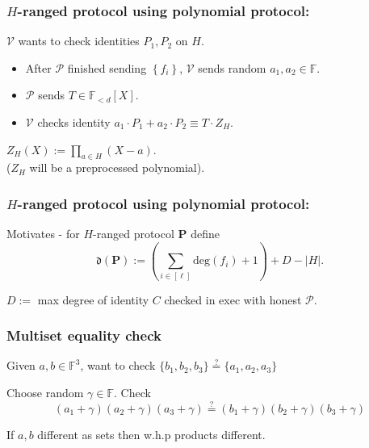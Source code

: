 \documentclass[shadesubsections,compress,14pt,mathserif]{beamer}
\newcommand{\prot}{\mathbf{P}}
\newcommand{\aggdeg}[1]{\mathfrak{d}(#1)}
\renewcommand{\deg}{\mathrm{deg}}
\newcommand{\F}{\ensuremath{\mathbb F}}
\newcommand{\set}[1]{\ensuremath{\left\{#1\right\}}}
\newcommand{\defeq}{\ensuremath{:=}}
\newcommand{\ver}{\ensuremath{\mathcal{V}}}
\newcommand{\prv}{\ensuremath{\mathcal{P}}}
\newcommand{\polysofdeg}[1]{\F_{< #1}[X]}
\begin{document}
\begin{frame}
\frametitle{$H$-ranged protocol using polynomial protocol:}   %
 
 
 $\ver$ wants to check identities $P_1,P_2$ on $H$.\\
 \vspace{0.2in}
\begin{itemize}
\item  After $\prv$ finished sending \set{f_i}, $\ver$ sends random $a_1,a_2\in \F$.\\ \pause
\item $\prv$ sends  $T\in \polysofdeg{d}$.\\ \pause
\item $\ver$ checks identity
$a_1\cdot P_1 + a_2\cdot P_2 \equiv T\cdot Z_H$.
\end{itemize}
 \vspace{0.2in}
$Z_H(X)\defeq \prod_{a\in H}(X-a)$. \\
($Z_H$ will be a preprocessed polynomial).\\
 \vspace{0.2in}
 

\end{frame}
\begin{frame}
\frametitle{$H$-ranged protocol using polynomial protocol:}   %
Motivates - for $H$-ranged protocol $\prot$ define
 \[\aggdeg{\prot}\defeq \left(\sum_{i\in [\ell]} \deg(f_i)+1\right) + D- |H|.\]

$D\defeq$ max degree of identity $C$ checked in exec with honest $\prv$.\\
 \vspace{0.2in}
 

\end{frame}

\begin{frame}
\frametitle{Multiset equality check}
Given $a,b\in \F^3$, want to check $\{b_1,b_2,b_3\} \stackrel{?}{=} \{a_1,a_2,a_3\}$ \\ \pause
 \vspace{0.2in}

  
 Choose random $\gamma\in \F$. Check
  \[(a_1 + \gamma)(a_2+ \gamma)(a_3 + \gamma) \stackrel{?}{=} (b_1+\gamma)(b_2+\gamma)(b_3+\gamma)\]\pause

 \vspace{0.2in}
 If $a,b$ different as sets then w.h.p products different.\pause
 
\end{frame}
\end{document}
